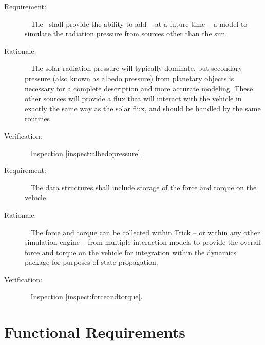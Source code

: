 \label{reqt:albedopressure}
\begin{description}
  \item[Requirement:]\ \newline
     The \RadiationPressureDesc\ shall provide the ability to add  -- at a future time --
     a model to simulate the radiation pressure from sources other than the sun.

  \item[Rationale:]\ \newline
     The solar radiation pressure will typically dominate, but secondary pressure (also known as albedo pressure) from planetary objects is necessary for a complete
     description and more accurate modeling.  These other sources will provide
     a flux that will interact with the vehicle in exactly the same way as the
     solar flux, and should be handled by the same routines.

  \item[Verification:]\ \newline
     Inspection \vref{inspect:albedopressure}.
\end{description}

\label{reqt:forceandtorque}
\begin{description}
  \item[Requirement:]\ \newline
     The data structures shall include storage of the force and torque on the
     vehicle.

  \item[Rationale:]\ \newline
     The force and torque can be collected within Trick -- or within any other
     simulation engine -- from multiple
     interaction models to provide the overall force and torque on the vehicle
     for integration within the dynamics package for purposes of state
     propagation.

  \item[Verification:]\ \newline
     Inspection \vref{inspect:forceandtorque}.
\end{description}

\section{Functional Requirements}\label{sec:func_reqts}




